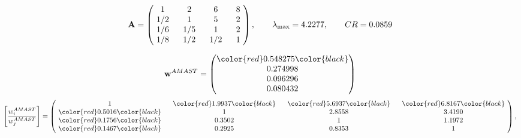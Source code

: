 \begin{example}
\begin{equation*}
\mathbf{A} =
\begin{pmatrix}
$\,\,$ 1 $\,\,$ & $\,\,$2$\,\,$ & $\,\,$6$\,\,$ & $\,\,$8 $\,\,$ \\
$\,\,$ 1/2$\,\,$ & $\,\,$ 1 $\,\,$ & $\,\,$5$\,\,$ & $\,\,$2 $\,\,$ \\
$\,\,$ 1/6$\,\,$ & $\,\,$ 1/5$\,\,$ & $\,\,$ 1 $\,\,$ & $\,\,$2 $\,\,$ \\
$\,\,$ 1/8$\,\,$ & $\,\,$ 1/2$\,\,$ & $\,\,$ 1/2$\,\,$ & $\,\,$ 1  $\,\,$ \\
\end{pmatrix},
\qquad
\lambda_{\max} =
4.2277,
\qquad
CR = 0.0859
\end{equation*}

\begin{equation*}
\mathbf{w}^{AMAST} =
\begin{pmatrix}
\color{red} 0.548275\color{black} \\
0.274998\\
0.096296\\
0.080432
\end{pmatrix}\end{equation*}
\begin{equation*}
\left[ \frac{{w}^{AMAST}_i}{{w}^{AMAST}_j} \right] =
\begin{pmatrix}
$\,\,$ 1 $\,\,$ & $\,\,$\color{red} 1.9937\color{black} $\,\,$ & $\,\,$\color{red} 5.6937\color{black} $\,\,$ & $\,\,$\color{red} 6.8167\color{black} $\,\,$ \\
$\,\,$\color{red} 0.5016\color{black} $\,\,$ & $\,\,$ 1 $\,\,$ & $\,\,$2.8558$\,\,$ & $\,\,$3.4190  $\,\,$ \\
$\,\,$\color{red} 0.1756\color{black} $\,\,$ & $\,\,$0.3502$\,\,$ & $\,\,$ 1 $\,\,$ & $\,\,$1.1972 $\,\,$ \\
$\,\,$\color{red} 0.1467\color{black} $\,\,$ & $\,\,$0.2925$\,\,$ & $\,\,$0.8353$\,\,$ & $\,\,$ 1  $\,\,$ \\
\end{pmatrix},
\end{equation*}


\end{example}
